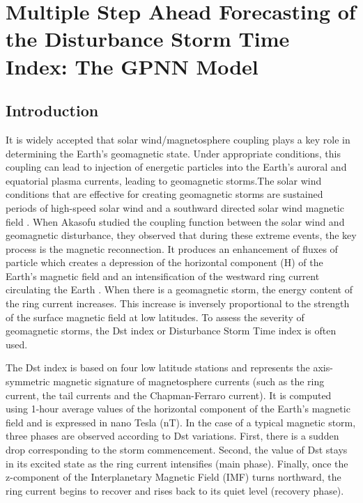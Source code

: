 \chapter{Multiple Step Ahead Forecasting of the Disturbance Storm Time Index: The GPNN Model}\label{chapter:dst_msa}

\section{Introduction}

It is widely accepted that solar wind/magnetosphere coupling plays a key role in determining the Earth’s 
geomagnetic state. Under appropriate conditions, this coupling can lead to injection of energetic particles 
into the Earth’s auroral and equatorial plasma currents, leading to geomagnetic storms.The solar wind conditions 
that are effective for creating geomagnetic storms are sustained periods of high-speed solar wind and a southward 
directed solar wind magnetic field \cite{JGR:JGR10260}. When Akasofu \cite{1981AkasofuE} studied the coupling function 
between the solar wind and geomagnetic disturbance, they observed that during these extreme events, the key process 
is the magnetic reconnection. It produces an enhancement of fluxes of particle which creates a depression of the 
horizontal component (H) of the Earth’s magnetic field and an intensification of the westward ring current 
circulating the Earth \cite{JGRA:JGRA11775}. When there is a geomagnetic storm, the energy content of the ring current 
increases. This increase is inversely proportional to the strength of the surface magnetic field at low latitudes. 
To assess the severity of geomagnetic storms, the Dst index or Disturbance Storm Time index is often used. 

The Dst index \cite{Sugiura1964} is based on four low latitude stations and represents the axis-symmetric 
magnetic signature of magnetosphere currents (such as the ring current, the tail currents and the 
Chapman-Ferraro current). It is computed using 1-hour average values of the horizontal component of the 
Earth’s magnetic field and is expressed in nano Tesla (nT). In the case of a typical magnetic storm, 
three phases are observed according to Dst variations. First, there is a sudden drop corresponding to 
the storm commencement. Second, the value of Dst stays in its excited state as the ring current intensifies 
(main phase). Finally, once the z-component of the Interplanetary Magnetic Field (IMF) turns northward, 
the ring current begins to recover and rises back to its quiet level (recovery phase). 

